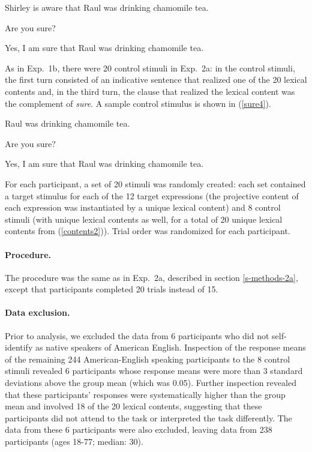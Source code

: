 \documentclass[11pt,fleqn]{article}
\newcommand{\6}{\mbox{$[\hspace*{-.6mm}[$}}
\newcommand{\9}{\mbox{$]\hspace*{-.6mm}]$}}
\begin{document}
\begin{exe}
\ex\label{sure3}
\begin{xlist}
 Shirley is aware that Raul was drinking chamomile tea.

 Are you sure?

 Yes, I am sure that Raul was drinking chamomile tea.
\end{xlist}
\end{exe}

As in Exp.~1b, there were 20 control stimuli in Exp.~2a: in the control stimuli, the first turn consisted of an indicative sentence that realized one of the 20 lexical contents and, in the third turn, the clause that realized the lexical content was the complement of {\em sure}. A sample control stimulus is shown in (\ref{sure4}).

\begin{exe}
\ex\label{sure4}
\begin{xlist}
 Raul was drinking chamomile tea.

 Are you sure?

 Yes, I am sure that Raul was drinking chamomile tea.
\end{xlist}
\end{exe}

For each participant, a set of 20 stimuli was randomly created: each set contained a target stimulus for each of the 12 target expressions (the projective content of each expression was instantiated by a unique lexical content) and 8 control stimuli (with unique lexical contents as well, for a total of 20 unique lexical contents from (\ref{contents2})). Trial order was randomized for each participant.

\paragraph{Procedure.} The procedure was the same as in Exp.~2a, described in section \ref{s-methods-2a}, except that participants completed 20 trials instead of 15.

\paragraph{Data exclusion.} Prior to analysis, we excluded the data from 6 participants who did not self-identify as native speakers of American English. Inspection of the response means of the remaining 244 American-English speaking participants to the 8 control stimuli revealed 6 participants whose response means were more than 3 standard deviations above the group mean (which was 0.05). Further inspection revealed that these participants' responses were systematically higher than the group mean and involved 18 of the 20 lexical contents, suggesting that these participants did not attend to the task or interpreted the task differently. The data from these 6 participants were also excluded, leaving data from 238 participants (ages 18-77; median: 30).
\end{document}
